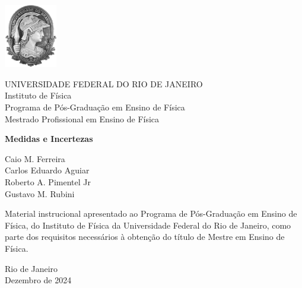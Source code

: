 \documentclass[12pt, a4paper]{article}
\begin{document}
{}
\pagestyle{empty}	%


\begin{flushleft}
    \parbox{2.5cm}{\includegraphics[width=2.3cm]{PEF_minerva.pdf} }
    \parbox{10cm}{
        UNIVERSIDADE FEDERAL DO RIO DE JANEIRO \\ 
        Instituto de Física \\ 
        Programa de Pós-Graduação em Ensino de Física \\ 
        Mestrado Profissional em Ensino de Física}
\end{flushleft}

\begin{center}
\vspace{2cm}
{\large\textbf{\Large Medidas e Incertezas}} %


\vspace{0.5cm}
\begin{flushright}
    \parbox{9cm}{ \large
        {Caio M. Ferreira      \\
        Carlos Eduardo Aguiar  \\
        Roberto A. Pimentel Jr \\
        Gustavo M. Rubini}}        %
\end{flushright}
\end{center}

\vspace{1.5cm}
\begin{flushright}
    \parbox{10.7cm}{\large
    Material instrucional apresentado ao Programa de Pós-Graduação em Ensino de Física, do Instituto de Física da Universidade Federal do Rio de Janeiro, como parte dos requisitos necessários à obtenção do título de Mestre em Ensino de Física.
    }
\end{flushright}

\vfill

\begin{center}
Rio de Janeiro\\Dezembro de 2024
\end{center}
\end{document}
